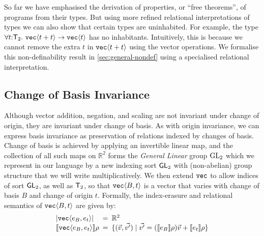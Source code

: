 \begin{example}\label{ex:uninhabited-type}
  So far we have emphasised the derivation of properties, or ``free
  theorems'', of programs from their types. But using more refined
  relational interpretations of types we can also show that certain
  types are uninhabited. For example, the type $\forall t \mathord:
  \mathsf{T}_2.\ \textup{\texttt{vec}}\langle t + t \rangle \to \textup{\texttt{vec}}\langle t \rangle$ has no
  inhabitants. Intuitively, this is because we cannot remove the extra
  $t$ in $\textup{\texttt{vec}}\langle t+t \rangle$ using the vector operations. We formalise
  this non-definability result in \autoref{sec:general-nondef} using a
  specialised relational interpretation.
\end{example}

\subsection{Change of Basis Invariance}
\label{sec:motivation-generalising}

Although vector addition, negation, and scaling are not invariant
under change of origin, they are invariant under change of basis. As
with origin invariance, we can express basis invariance as
preservation of relations indexed by changes of basis. Change of basis
is achieved by applying an invertible linear map, and the collection
of all such maps on $\mathbb{R}^2$ forms the \emph{General Linear}
group $\mathrm{GL}_2$ which we represent in our language by a new indexing
sort $\mathsf{GL}_2$ with (non-abelian) group structure that we will write
multiplicatively. We then extend $\textup{\texttt{vec}}$ to allow indices of
sort $\mathsf{GL}_2$, as well as $\mathsf{T}_2$, so that
$\textup{\texttt{vec}}\langle B,t \rangle$ is a vector that varies with change of basis $B$
and change of origin $t$. Formally, the index-erasure and relational
semantics of $\textup{\texttt{vec}}\langle B,t \rangle$ are given by:
\begin{displaymath}
  \begin{array}{l@{\hspace{0.5em}=\hspace{0.5em}}l}
    \tySem{\tyPrim{vec}{e_B,e_t}} & \mathbb{R}^2
    \\ \rsem{\tyPrim{vec}{e_B,e_t}}{}\rho & \{ (\vec{v},\vec{v'})
    \sepbar \vec{v'} = (\sem{e_B}\rho)\vec{v} + \sem{e_t}\rho \}
  \end{array}
\end{displaymath}

